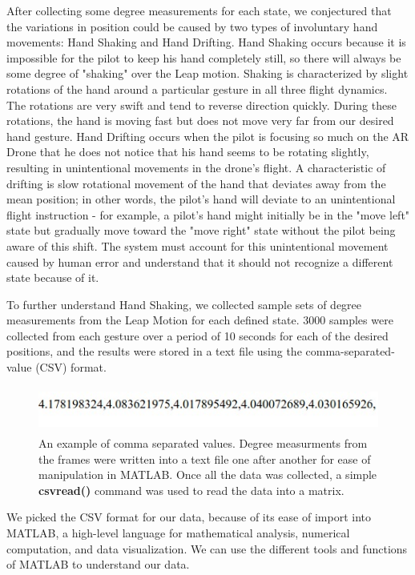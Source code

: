 \documentclass[letterpaper,english, 12pt]{article}
\begin{document}
After collecting some degree measurements for each state, we conjectured that the variations in position could be caused by two types of involuntary hand movements: Hand Shaking and Hand Drifting.  Hand Shaking occurs because it is impossible for the pilot to keep his hand completely still, so there will always be some degree of "shaking" over the Leap motion. Shaking is characterized by slight rotations of the hand around a particular gesture in all three flight dynamics. The rotations are very swift and tend to reverse direction quickly. During these rotations, the hand is moving fast but does not move very far from our desired hand gesture.  Hand Drifting occurs when the pilot is focusing so much on the AR Drone that he does not notice that his hand seems to be rotating slightly, resulting in unintentional movements in the drone's flight. A characteristic of drifting is slow rotational movement of the hand that deviates away from the mean position; in other words, the pilot's hand will deviate to an unintentional flight instruction - for example, a pilot's hand might initially be in the "move left" state but gradually move toward the "move right" state without the pilot being aware of this shift. The system must account for this unintentional movement caused by human error and understand that it should not recognize a different state because of it. 

To further understand Hand Shaking, we collected sample sets of degree measurements from the Leap Motion for each defined state. 3000 samples were collected from each gesture over a period of 10 seconds for each of the desired positions, and the results were stored in a text file using the comma-separated-value (CSV) format.

\begin{figure}[t]
	\centering
	\includegraphics[height=1.5cm,width=130mm]{pics/CSV.jpg}
	\caption{An example of comma separated values. Degree measurments from the frames were written into a text file one after another for ease of manipulation in MATLAB. Once all the data was collected, a simple \textbf{csvread()} command was used to read the data into a matrix.}
\end{figure}


We picked the CSV format for our data, because of its ease of import into MATLAB, a high-level language for mathematical analysis, numerical computation, and data visualization.  We can use the different tools and functions of MATLAB to understand our data.
 
\end{document}
